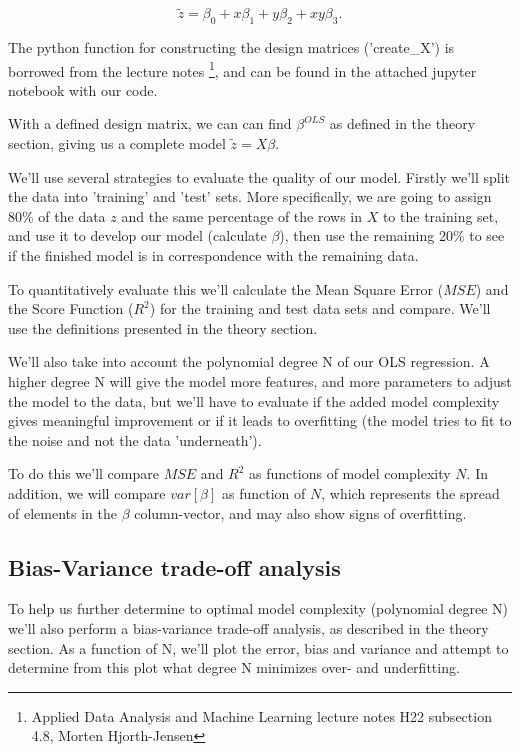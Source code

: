 \documentclass[reprint,english,notitlepage]{revtex4-1}  %
\begin{document}
$$\tilde{z} = \beta_0 + x\beta_1 + y\beta_2 + xy\beta_3.$$

The python function for constructing the design matrices ('create\_X') is borrowed from the lecture notes \footnote{Applied Data Analysis and Machine Learning lecture notes H22 subsection 4.8, Morten Hjorth-Jensen}, and can be found in the attached jupyter notebook with our code.

With a defined design matrix, we can can find $\beta^{OLS}$ as defined in the theory section, giving us a complete model $\tilde{z} = X\beta$.

We'll use several strategies to evaluate the quality of our model. Firstly we'll split the data into 'training' and 'test' sets. More specifically, we are going to assign 80\% of the data $z$ and the same percentage of the rows in $X$ to the training set, and use it to develop our model (calculate $\beta$), then use the remaining 20\% to see if the finished model is in correspondence with the remaining data.

To quantitatively evaluate this we'll calculate the Mean Square Error ($MSE$) and the Score Function ($R^2$) for the training and test data sets and compare. We'll use the definitions presented in the theory section.

We'll also take into account the polynomial degree N of our OLS regression. A higher degree N will give the model more features, and more parameters to adjust the model to the data, but we'll have to evaluate if the added model complexity gives meaningful improvement or if it leads to overfitting (the model tries to fit to the noise and not the data 'underneath').

To do this we'll compare $MSE$ and $R^2$ as functions of model complexity $N$. In addition, we will compare $var[\beta]$ as function of $N$, which represents the spread of elements in the $\beta$ column-vector, and may also show signs of overfitting.

\subsection{Bias-Variance trade-off analysis}

To help us further determine to optimal model complexity (polynomial degree N) we'll also perform a bias-variance trade-off analysis, as described in the theory section. As a function of N, we'll plot the error, bias and variance and attempt to determine from this plot what degree N minimizes over- and underfitting.
\end{document}

